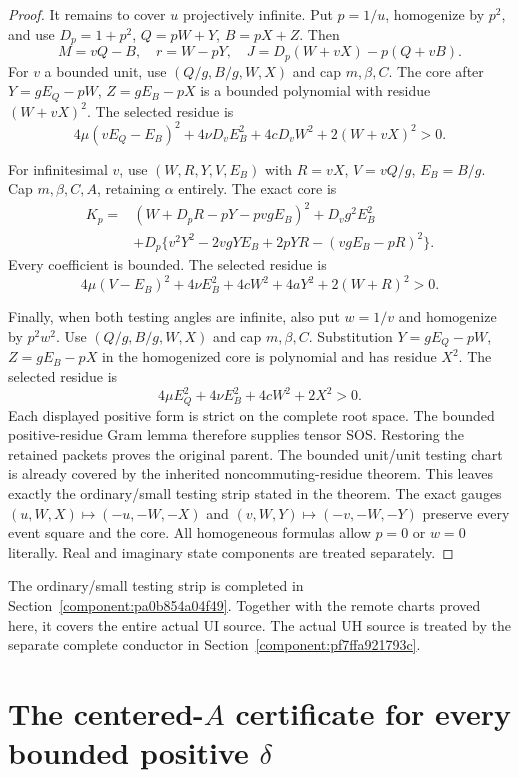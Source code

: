 \begin{proof}
It remains to cover $u$ projectively infinite. Put $p=1/u$,
homogenize by $p^2$, and use $D_p=1+p^2$,
$Q=pW+Y$, $B=pX+Z$. Then
\[
 M=vQ-B,\quad r=W-pY,\quad
 J=D_p(W+vX)-p(Q+vB).                              \tag{CR9}
\]
For $v$ a bounded unit, use $(Q/g,B/g,W,X)$ and cap $m,\beta,C$.
The core after $Y=gE_Q-pW$, $Z=gE_B-pX$ is a bounded polynomial
with residue $(W+vX)^2$. The selected residue is
\[
 4\mu(vE_Q-E_B)^2+4\nu D_vE_B^2
           +4cD_vW^2+2(W+vX)^2>0.                 \tag{CR10}
\]

For infinitesimal $v$, use $(W,R,Y,V,E_B)$ with
$R=vX$, $V=vQ/g$, $E_B=B/g$. Cap $m,\beta,C,A$, retaining
$\alpha$ entirely. The exact core is
\begin{align*}
K_p={}&(W+D_pR-pY-pvgE_B)^2+D_vg^2E_B^2\\
 &+D_p\{v^2Y^2-2vgYE_B+2pYR-(vgE_B-pR)^2\}.
                                                               \tag{CR11}
\end{align*}
Every coefficient is bounded. The selected residue is
\[
 4\mu(V-E_B)^2+4\nu E_B^2+4cW^2+4aY^2
                    +2(W+R)^2>0.                 \tag{CR12}
\]

Finally, when both testing angles are infinite, also put $w=1/v$
and homogenize by $p^2w^2$. Use $(Q/g,B/g,W,X)$ and cap
$m,\beta,C$. Substitution $Y=gE_Q-pW$, $Z=gE_B-pX$ in the
homogenized core is polynomial and has residue $X^2$.
The selected residue is
\[
 4\mu E_Q^2+4\nu E_B^2+4cW^2+2X^2>0.               \tag{CR13}
\]
Each displayed positive form is strict on the complete root space.
The bounded positive-residue Gram lemma therefore supplies tensor
SOS. Restoring the retained packets proves the original parent.
The bounded unit/unit testing chart is already covered by the
inherited noncommuting-residue theorem. This leaves exactly the
ordinary/small testing strip stated in the theorem. The exact gauges
$(u,W,X)\mapsto(-u,-W,-X)$ and
$(v,W,Y)\mapsto(-v,-W,-Y)$ preserve every event square and the core.
All homogeneous formulas allow $p=0$ or $w=0$ literally.
Real and imaginary state components are treated separately.
\end{proof}

The ordinary/small testing strip is completed in Section~\ref{component:pa0b854a04f49}. Together with the remote charts proved here, it covers the entire actual UI source. The actual UH source is treated by the separate complete conductor in Section~\ref{component:pf7ffa921793c}.


\section{\texorpdfstring{The centered-$A$ certificate for every bounded positive $\delta$}{The centered-A certificate for every bounded positive delta}}
\label{component:pccaa793fd0bf}


